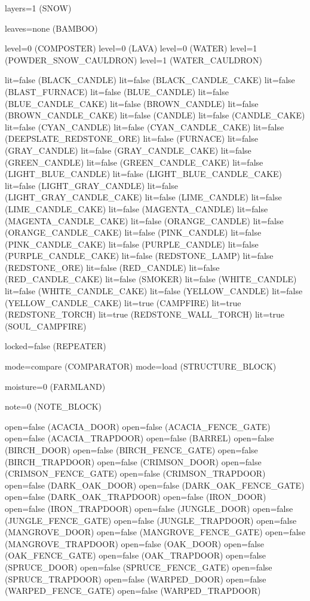 layers=1 (SNOW)

leaves=none (BAMBOO)

level=0 (COMPOSTER)
level=0 (LAVA)
level=0 (WATER)
level=1 (POWDER_SNOW_CAULDRON)
level=1 (WATER_CAULDRON)

lit=false (BLACK_CANDLE)
lit=false (BLACK_CANDLE_CAKE)
lit=false (BLAST_FURNACE)
lit=false (BLUE_CANDLE)
lit=false (BLUE_CANDLE_CAKE)
lit=false (BROWN_CANDLE)
lit=false (BROWN_CANDLE_CAKE)
lit=false (CANDLE)
lit=false (CANDLE_CAKE)
lit=false (CYAN_CANDLE)
lit=false (CYAN_CANDLE_CAKE)
lit=false (DEEPSLATE_REDSTONE_ORE)
lit=false (FURNACE)
lit=false (GRAY_CANDLE)
lit=false (GRAY_CANDLE_CAKE)
lit=false (GREEN_CANDLE)
lit=false (GREEN_CANDLE_CAKE)
lit=false (LIGHT_BLUE_CANDLE)
lit=false (LIGHT_BLUE_CANDLE_CAKE)
lit=false (LIGHT_GRAY_CANDLE)
lit=false (LIGHT_GRAY_CANDLE_CAKE)
lit=false (LIME_CANDLE)
lit=false (LIME_CANDLE_CAKE)
lit=false (MAGENTA_CANDLE)
lit=false (MAGENTA_CANDLE_CAKE)
lit=false (ORANGE_CANDLE)
lit=false (ORANGE_CANDLE_CAKE)
lit=false (PINK_CANDLE)
lit=false (PINK_CANDLE_CAKE)
lit=false (PURPLE_CANDLE)
lit=false (PURPLE_CANDLE_CAKE)
lit=false (REDSTONE_LAMP)
lit=false (REDSTONE_ORE)
lit=false (RED_CANDLE)
lit=false (RED_CANDLE_CAKE)
lit=false (SMOKER)
lit=false (WHITE_CANDLE)
lit=false (WHITE_CANDLE_CAKE)
lit=false (YELLOW_CANDLE)
lit=false (YELLOW_CANDLE_CAKE)
lit=true (CAMPFIRE)
lit=true (REDSTONE_TORCH)
lit=true (REDSTONE_WALL_TORCH)
lit=true (SOUL_CAMPFIRE)

locked=false (REPEATER)

mode=compare (COMPARATOR)
mode=load (STRUCTURE_BLOCK)

moisture=0 (FARMLAND)

note=0 (NOTE_BLOCK)

open=false (ACACIA_DOOR)
open=false (ACACIA_FENCE_GATE)
open=false (ACACIA_TRAPDOOR)
open=false (BARREL)
open=false (BIRCH_DOOR)
open=false (BIRCH_FENCE_GATE)
open=false (BIRCH_TRAPDOOR)
open=false (CRIMSON_DOOR)
open=false (CRIMSON_FENCE_GATE)
open=false (CRIMSON_TRAPDOOR)
open=false (DARK_OAK_DOOR)
open=false (DARK_OAK_FENCE_GATE)
open=false (DARK_OAK_TRAPDOOR)
open=false (IRON_DOOR)
open=false (IRON_TRAPDOOR)
open=false (JUNGLE_DOOR)
open=false (JUNGLE_FENCE_GATE)
open=false (JUNGLE_TRAPDOOR)
open=false (MANGROVE_DOOR)
open=false (MANGROVE_FENCE_GATE)
open=false (MANGROVE_TRAPDOOR)
open=false (OAK_DOOR)
open=false (OAK_FENCE_GATE)
open=false (OAK_TRAPDOOR)
open=false (SPRUCE_DOOR)
open=false (SPRUCE_FENCE_GATE)
open=false (SPRUCE_TRAPDOOR)
open=false (WARPED_DOOR)
open=false (WARPED_FENCE_GATE)
open=false (WARPED_TRAPDOOR)

